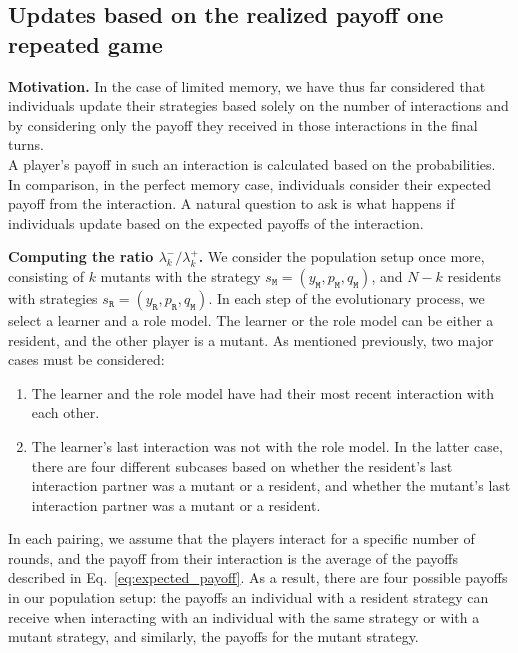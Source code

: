\documentclass[11pt]{article}
\def\resident{\texttt{R}}
\def\mutant{\texttt{M}}
\def\strategy{s}
\theoremstyle{plainCl1}
\theoremstyle{plainCl2}
\begin{document}

\subsection{Updates based on the realized payoff one repeated game}\label{section:one_interaction_full_memory}


{\bf Motivation.}
In the case of limited memory, we have thus far considered that individuals
update their strategies based solely on the number of interactions and by
considering only the payoff they received in those interactions in the final
turns. \\

\noindent
A player's payoff in such an interaction is calculated based on the
probabilities. In comparison, in the perfect memory case, individuals consider
their expected payoff from the interaction. A natural question to ask is what
happens if individuals update based on the expected payoffs of the interaction.

\noindent
{\bf Computing the ratio $\lambda^-_k/\lambda^+_k$.}
We consider the population setup once more, consisting of \(k\) mutants with the
strategy \(\strategy_\mutant=(y_\mutant,p_\mutant,q_\mutant)\), and \(N-k\)
residents with strategies \(\strategy_\resident =
(y_\resident,p_\resident,q_\mutant)\). In each step of the evolutionary process,
we select a learner and a role model. The learner or the role model can be
either a resident, and the other player is a mutant. As mentioned previously,
two major cases must be considered:

\begin{enumerate}
  \item The learner and the role model have had their most recent interaction
  with each other.
  \item The learner's last interaction was not with the role model. In the
  latter case, there are four different subcases based on whether the resident's
  last interaction partner was a mutant or a resident, and whether the mutant's
  last interaction partner was a mutant or a resident.
\end{enumerate}

\noindent
In each pairing, we assume that the players interact for a specific number of
rounds, and the payoff from their interaction is the average of the payoffs
described in Eq.~\eqref{eq:expected_payoff}. As a result, there are four
possible payoffs in our population setup: the payoffs an individual with a
resident strategy can receive when interacting with an individual with the same
strategy or with a mutant strategy, and similarly, the payoffs for the mutant
strategy. \\
\end{document}
